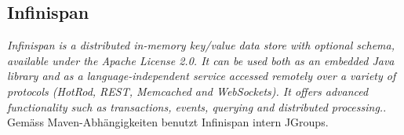 \subsection{Infinispan}
\emph{Infinispan is a distributed in-memory key/value data store with optional schema, available under the Apache License 2.0. It can be used both as an embedded Java library and as a language-independent service accessed remotely over a variety of protocols (HotRod, REST, Memcached and WebSockets). It offers advanced functionality such as transactions, events, querying and distributed processing.}. Gemäss Maven-Abhängigkeiten benutzt Infinispan intern JGroups. 